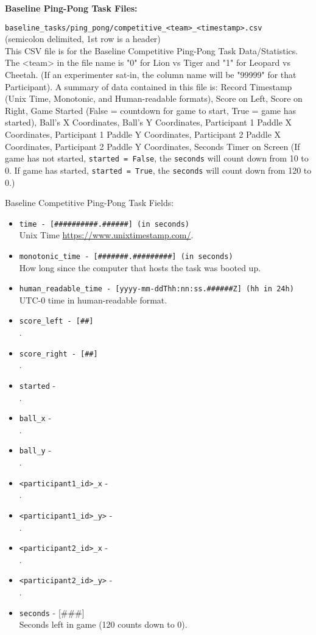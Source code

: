 \begin{description}
\bigskip\item\textbf{Baseline Ping-Pong Task Files:}
\medskip
\item\verb|baseline_tasks/ping_pong/competitive_<team>_<timestamp>.csv|\\(semicolon delimited, 1st row is a header)\\
This CSV file is for the Baseline Competitive Ping-Pong Task Data/Statistics. The <team> in the file name is "0" for Lion vs Tiger and "1" for Leopard vs Cheetah. (If an experimenter sat-in, the column name will be "99999" for that Participant). A summary of data contained in this file is: Record Timestamp (Unix Time, Monotonic, and Human-readable formats), Score on Left, Score on Right, Game Started (False = countdown for game to start, True = game has started), Ball's X Coordinates, Ball's Y Coordinates, Participant 1 Paddle X Coordinates, Participant 1 Paddle Y Coordinates, Participant 2 Paddle X Coordinates, Participant 2 Paddle Y Coordinates, Seconds Timer on Screen (If game has not started, \verb|started = False|, the \verb|seconds| will count down from 10 to 0. If game has started, \verb|started = True|, the \verb|seconds| will count down from 120 to 0.)

Baseline Competitive Ping-Pong Task Fields:
\begin{itemize}
    \item \verb|time - [##########.######] (in seconds)|\\Unix Time \href{https://www.unixtimestamp.com/}{https://www.unixtimestamp.com/}.
    \item \verb|monotonic_time - [#######.#########] (in seconds)|\\How long since the computer that hosts the task was booted up.
    \item \verb|human_readable_time - [yyyy-mm-ddThh:nn:ss.######Z] (hh in 24h)|\\ UTC-0 time in human-readable format.
    \item \verb|score_left - [##]|\\.
    \item \verb|score_right - [##]|\\.
    \item \verb|started| - \\.
    \item \verb|ball_x| - \\.
    \item \verb|ball_y| - \\.
    \item \verb|<participant1_id>_x| -\\.
    \item \verb|<participant1_id>_y>| -\\.
    \item \verb|<participant2_id>_x| -\\.
    \item \verb|<participant2_id>_y>| -\\.
    \item \verb|seconds| - [\#\#\#]\\Seconds left in game (120 counts down to 0).
\end{itemize}




\end{description}
